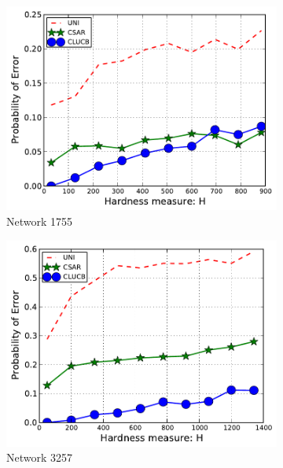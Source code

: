 \documentclass{article}
\begin{document}
\begin{figure}[htbp]
\centering
\begin{subfigure}[c]{\imgsize\textwidth}
	\includegraphics[width=\textwidth]{fig/exp/mst-c-1755}
	\caption{Network 1755}
\end{subfigure}
\begin{subfigure}[c]{\imgsize\textwidth}
	\includegraphics[width=\textwidth]{fig/exp/mst-c-3257}
	\caption{Network 3257}
\end{subfigure}
\begin{subfigure}[c]{\imgsize\textwidth}

\end{subfigure}
\end{figure}
\end{document}
